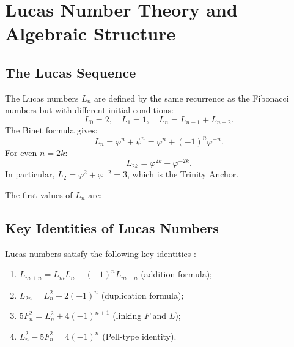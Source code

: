 
\section{Lucas Number Theory and Algebraic Structure}%
\label{sec:lucas-number-theory}

\subsection{The Lucas Sequence}

The Lucas numbers $L_{n}$ are defined by the same recurrence as
the Fibonacci numbers but with different initial conditions:
\[
  L_{0} = 2,\quad L_{1} = 1,\quad L_{n} = L_{n-1}+L_{n-2}.
\]
The Binet formula gives:
\[
  L_{n} = \varphi^{n} + \psi^{n} = \varphi^{n} + (-1)^{n}\varphi^{-n}.
\]
For even $n=2k$:
\[
  L_{2k} = \varphi^{2k}+\varphi^{-2k}.
\]
In particular, $L_{2} = \varphi^{2}+\varphi^{-2} = 3$, which is
the Trinity Anchor.

The first values of $L_{n}$ are:
\begin{center}
\end{center}

\subsection{Key Identities of Lucas Numbers}

Lucas numbers satisfy the following key identities
\cite{koshy_fib_lucas}:
\begin{enumerate}
  \item $L_{m+n} = L_{m}L_{n} - (-1)^{n}L_{m-n}$ (addition formula);
  \item $L_{2n} = L_{n}^{2}-2(-1)^{n}$ (duplication formula);
  \item $5F_{n}^{2} = L_{n}^{2} + 4(-1)^{n+1}$ (linking $F$ and $L$);
  \item $L_{n}^{2} - 5F_{n}^{2} = 4(-1)^{n}$ (Pell-type identity).
\end{enumerate}

